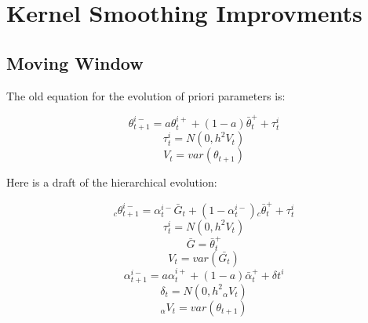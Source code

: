 \chapter{Kernel Smoothing Improvments}



\section{Moving Window}

The old equation for the evolution of priori parameters is:

\begin{equation}\label{eq:dekf_thetaminus}
\theta_{t+1}^{i-} = a\theta_{t}^{i+} + (1-a)\bar{\theta}_{t}^{+} + \tau_{t}^{i}
\end{equation}
\begin{equation}\label{eq:dekf_tau}
\tau_{t}^{i} = N(0, h^{2}V_{t})
\end{equation}
\begin{equation}\label{eq:dekf_V}
V_{t} = var(\theta_{t+1})
\end{equation}

Here is a draft of the hierarchical evolution:

\begin{equation}\label{eq:dekf_thetanew}
{}_{c}\theta_{t+1}^{i-} = \alpha_{t}^{i-}\bar{G}_{t} + (1-\alpha_{t}^{i-}){}_{c}\bar{\theta}_{t}^{+} + \tau_{t}^{i}
\end{equation}
\begin{equation}\label{eq:dekf_tau_2}
\tau_{t}^{i} = N(0, h^{2}V_{t})
\end{equation}
\begin{equation}\label{eq:dekf_G}
\bar{G} = \bar{\theta}_{t}^{+}
\end{equation}
\begin{equation}\label{eq:dekf_V_2}
V_{t} = var(\bar{G_{t}})
\end{equation}
\begin{equation}\label{eq:dekf_V_3}
\alpha_{t+1}^{i-} = a\alpha_{t}^{i+} + (1-a)\bar{\alpha}_{t}^{+} + \delta{t}^{i}
\end{equation}
\begin{equation}\label{eq:dekf_V_4}
\delta_{t} = N(0, h^{2}{}_{\alpha}V_{t})
\end{equation}
\begin{equation}\label{eq:dekf_V_5}
{}_{\alpha}V_{t} = var(\theta_{t+1})
\end{equation}

